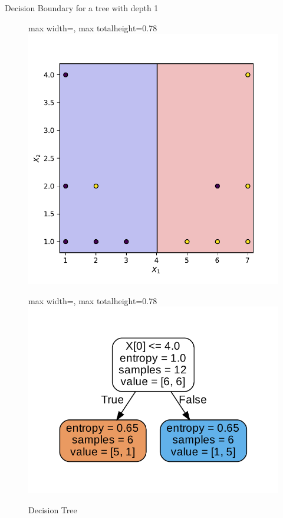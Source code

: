 \documentclass[aspectratio=169,10pt]{beamer}
\newcommand{\fitpic}[1]{\begin{adjustbox}{max width=\linewidth, max totalheight=0.78\textheight}#1\end{adjustbox}}
\begin{document}
	\begin{frame}{Decision Boundary for a tree with depth 1}
	\begin{figure}[h]
	    \centering
	    \begin{minipage}{0.45\textwidth}
	        \centering
	        \fitpic{\includegraphics[width=\textwidth]{example-1-depth-1-boundary}}
	        \caption{Decision Boundary}
	    \end{minipage}
	    \hfill
	    \begin{minipage}{0.45\textwidth}
	        \centering
	        \fitpic{\includegraphics[width=\textwidth]{example-1-depth-1-decision-tree}}
	        \caption{Decision Tree}
	    \end{minipage}
	\end{figure}
	\end{frame}
	
\end{document}
